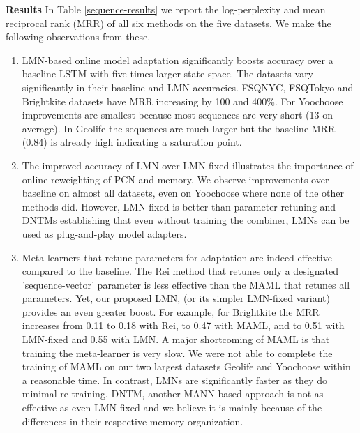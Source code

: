\documentclass[letterpaper]{article} %
\begin{document}
\begin{table}[!htb]
\begin{center}
\begin{tabular}{|l|r|r|r|r|r|r|r|} \hline

\end{tabular}
\end{center}
\end{table}
{ \bf Results}
In Table \ref{sequence-results} we report the log-perplexity and mean reciprocal rank (MRR) of all six methods on the five datasets. We make the following observations from these.
\begin{enumerate}
\item LMN-based online model adaptation significantly boosts accuracy over a baseline LSTM with five times larger state-space.  
The datasets vary significantly in their baseline and LMN accuracies. FSQNYC, FSQTokyo and Brightkite datasets have MRR increasing by 100 and 400\%.  For Yoochoose improvements are smallest because most sequences are very short (13 on average). In Geolife the sequences are much larger but the baseline MRR (0.84) is already high indicating a saturation point.
\item The improved accuracy of LMN over LMN-fixed illustrates the importance of online reweighting of PCN and memory. We observe improvements over baseline on almost all datasets, even on Yoochoose where none of the other methods did.  However, LMN-fixed is better than parameter retuning and DNTMs establishing that even without training the combiner, LMNs can be used as plug-and-play model adapters.
\item Meta learners that retune parameters for adaptation are indeed effective compared to the baseline.  The Rei method that retunes only a designated 'sequence-vector' parameter is less effective than the MAML that retunes all parameters. Yet, our proposed LMN, (or its simpler LMN-fixed variant) provides an even greater boost.  For example, for Brightkite the MRR increases from 0.11 to 0.18 with Rei, to 0.47 with MAML, and to 0.51 with LMN-fixed and 0.55 with LMN. 
A major shortcoming of MAML is that training the meta-learner is very slow.  We were not able to complete the training of MAML on our two largest datasets Geolife and Yoochoose within a reasonable time. In contrast, LMNs are significantly faster as they do minimal re-training.
DNTM, another MANN-based approach is not as effective as even LMN-fixed and we believe it is mainly because of the differences in their respective memory organization. 
\end{enumerate}
\end{document}

